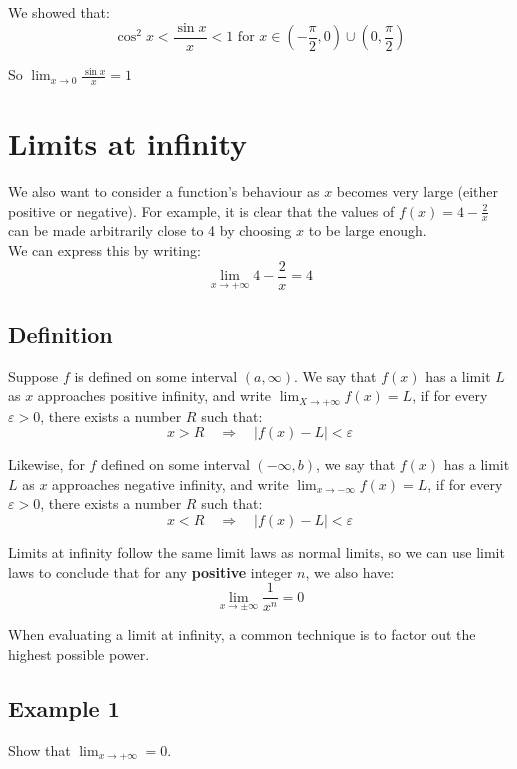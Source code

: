 \documentclass[11pt]{article}
\begin{document}
We showed that:
\[\cos^2 x < \frac{\sin x}{x} < 1 \text{ for } x \in (-\frac{\pi}{2}, 0) \cup (0, \frac{\pi}{2})\]

So \(\lim_{x \rightarrow 0} \frac{\sin x}{x} = 1\)


\section{Limits at infinity}
\label{sec:org4a704e2}
We also want to consider a function's behaviour as \(x\) becomes very large (either positive or negative). For example, it is clear that the values of \(f(x) = 4 - \frac{2}{x}\) can be made arbitrarily close to 4 by choosing \(x\) to be large enough.
\\[0pt]

We can express this by writing:
\[\lim_{x \rightarrow + \infty} 4 - \frac{2}{x} = 4\]


\subsection{Definition}
\label{sec:org2c6f293}
Suppose \(f\) is defined on some interval \((a, \infty)\). We say that \(f(x)\) has a limit \(L\) as \(x\) approaches positive infinity, and write \(\lim_{X \rightarrow + \infty} f(x) = L\), if for every \(\varepsilon > 0\), there exists a number \(R\) such that:
\[x > R \quad \Rightarrow \quad |f(x) - L| < \varepsilon\]

Likewise, for \(f\) defined on some interval \((-\infty, b)\), we say that \(f(x)\) has a limit \(L\) as \(x\) approaches negative infinity, and write \(\lim_{x \rightarrow - \infty} f(x) = L\), if for every \(\varepsilon > 0\), there exists a number \(R\) such that:
\[x < R \quad \Rightarrow \quad |f(x) - L| < \varepsilon\]

Limits at infinity follow the same limit laws as normal limits, so we can use limit laws to conclude that for any \textbf{positive} integer \(n\), we also have:
\[\lim_{x \rightarrow \pm \infty} \frac{1}{x^n} = 0\]

When evaluating a limit at infinity, a common technique is to factor out the highest possible power.

\subsection{Example 1}
\label{sec:orgc8e7fc5}
Show that \(\lim_{x \rightarrow + \infty} = 0\).
\\[0pt]
\end{document}
